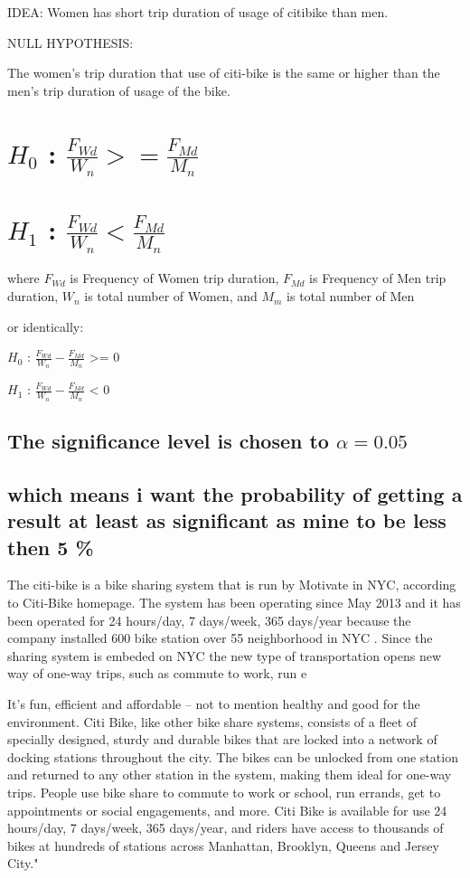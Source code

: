 IDEA:
Women has short trip duration of usage of citibike than men.

NULL HYPOTHESIS:

The women's trip duration that use of citi-bike is the same or higher than the men's trip duration of usage of the bike.

\section{$H_0$ : $\frac{F_{Wd}}{W_{n}} >= \frac{F_{Md}}{M_{n}} $ }



\section{$H_1$ : $\frac{F_{Wd}}{W_{n}} < \frac{F_{Md}}{M_{n}} $}

where $F_{Wd}$ is Frequency of Women trip duration, $F_{Md}$ is Frequency of Men trip duration, ${W_{n}}$ is total number of Women, and ${M_{m}}$ is total number of Men

or identically:

$H_0$ : $\frac{F_{Wd}}{W_{n}} - \frac{F_{Md}}{M_{n}} $ >= 0

$H_1$ : $\frac{F_{Wd}}{W_{n}} - \frac{F_{Md}}{M_{n}} $ < 0

\subsection{The significance level is chosen to $\alpha=0.05$}

\subsection{which means i want the probability of getting a result at least as significant as mine to be less then 5 \%}


The citi-bike is a bike sharing system that is run by Motivate in NYC, according to Citi-Bike homepage\cite{nyc}. The system has been operating since May 2013 and it has been operated for 24 hours/day, 7 days/week, 365 days/year because the company installed 600 bike station over 55 neighborhood in NYC \cite{nyc}. Since the sharing system is embeded on NYC the new type of transportation opens new way of one-way trips, such as commute to work, run e 

It's fun, efficient and affordable – not to mention healthy and good for the environment.
Citi Bike, like other bike share systems, consists of a fleet of specially designed, sturdy and durable bikes that are locked into a network of docking stations throughout the city. The bikes can be unlocked from one station and returned to any other station in the system, making them ideal for one-way trips. People use bike share to commute to work or school, run errands, get to appointments or social engagements, and more.
Citi Bike is available for use 24 hours/day, 7 days/week, 365 days/year, and riders have access to thousands of bikes at hundreds of stations across Manhattan, Brooklyn, Queens and Jersey City." 